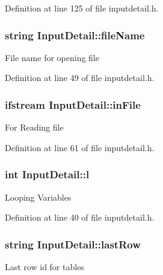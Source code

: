 Definition at line 125 of file inputdetail.\-h.

\hypertarget{classInputDetail_a4a7fb27e52bed0f40de143634f2c486b}{
\subsubsection[{file\-Name}]{\setlength{\rightskip}{0pt plus 5cm}string Input\-Detail\-::file\-Name\hspace{0.3cm}{\ttfamily [protected]}}}\label{classInputDetail_a4a7fb27e52bed0f40de143634f2c486b}
File name for opening file 

Definition at line 49 of file inputdetail.\-h.

\hypertarget{classInputDetail_a4c62c1934fbfcdcc8e2afaee44a87c15}{
\subsubsection[{in\-File}]{\setlength{\rightskip}{0pt plus 5cm}ifstream Input\-Detail\-::in\-File\hspace{0.3cm}{\ttfamily [protected]}}}\label{classInputDetail_a4c62c1934fbfcdcc8e2afaee44a87c15}
For Reading file 

Definition at line 61 of file inputdetail.\-h.

\hypertarget{classInputDetail_a3a950727518c2f6ed3c068125a037b9e}{
\subsubsection[{l}]{\setlength{\rightskip}{0pt plus 5cm}int Input\-Detail\-::l\hspace{0.3cm}{\ttfamily [protected]}}}\label{classInputDetail_a3a950727518c2f6ed3c068125a037b9e}
Looping Variables 

Definition at line 40 of file inputdetail.\-h.

\hypertarget{classInputDetail_a8e266c7e4fae2e36b254fec63e20d88a}{
\subsubsection[{last\-Row}]{\setlength{\rightskip}{0pt plus 5cm}string Input\-Detail\-::last\-Row\hspace{0.3cm}{\ttfamily [protected]}}}\label{classInputDetail_a8e266c7e4fae2e36b254fec63e20d88a}
Last row id for tables 

